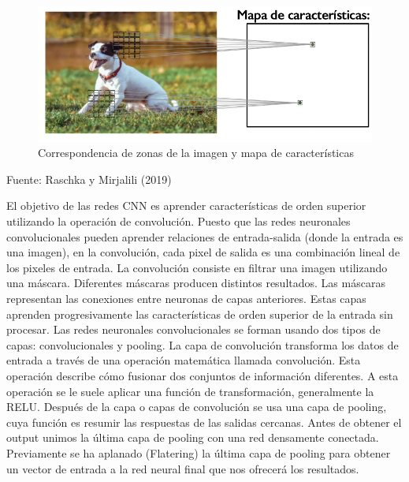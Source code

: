 \documentclass[
  a4paper,
  DIV=11,
  numbers=noendperiod]{scrreprt}
\begin{document}
\begin{figure}

{\centering \includegraphics{imagenes/capitulo1/correspondencia_featrures.png}

}

\caption{\label{fig-correspondencia-features}Correspondencia de zonas de
la imagen y mapa de características}

\end{figure}

Fuente: Raschka y Mirjalili (2019)

El objetivo de las redes CNN es aprender características de orden
superior utilizando la operación de convolución. Puesto que las redes
neuronales convolucionales pueden aprender relaciones de entrada-salida
(donde la entrada es una imagen), en la convolución, cada pixel de
salida es una combinación lineal de los pixeles de entrada. La
convolución consiste en filtrar una imagen utilizando una máscara.
Diferentes máscaras producen distintos resultados. Las máscaras
representan las conexiones entre neuronas de capas anteriores. Estas
capas aprenden progresivamente las características de orden superior de
la entrada sin procesar. Las redes neuronales convolucionales se forman
usando dos tipos de capas: convolucionales y pooling. La capa de
convolución transforma los datos de entrada a través de una operación
matemática llamada convolución. Esta operación describe cómo fusionar
dos conjuntos de información diferentes. A esta operación se le suele
aplicar una función de transformación, generalmente la RELU. Después de
la capa o capas de convolución se usa una capa de pooling, cuya función
es resumir las respuestas de las salidas cercanas. Antes de obtener el
output unimos la última capa de pooling con una red densamente
conectada. Previamente se ha aplanado (Flatering) la última capa de
pooling para obtener un vector de entrada a la red neural final que nos
ofrecerá los resultados.
\end{document}
